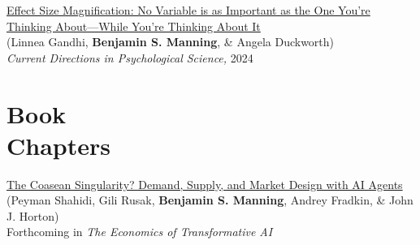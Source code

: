 \documentclass[margin,line,pifont,palatino,courier, 9pt]{res}
\begin{document}
\begin{resume}
\href{https://journals.sagepub.com/doi/full/10.1177/09637214241268222}{Effect Size Magnification: No Variable is as Important as the One You're Thinking About---While You're Thinking About It}\\
(Linnea Gandhi\footnotemark[\value{footnote}], \textbf{Benjamin S. Manning}, \& Angela Duckworth)\\
\textit{Current Directions in Psychological Science,} 2024

\section{\sc Book \\ Chapters}
\href{https://www.nber.org/books-and-chapters/economics-transformative-ai/coasean-singularity-demand-supply-and-market-design-ai-agents}{The Coasean Singularity? Demand, Supply, and Market Design with AI Agents}\\
(Peyman Shahidi\footnotemark[\value{footnote}], Gili Rusak\footnotemark[\value{footnote}], \textbf{Benjamin S. Manning}\footnotemark[\value{footnote}], Andrey Fradkin\footnotemark[\value{footnote}], \& John J. Horton\footnotemark[\value{footnote}])\\
Forthcoming in \textit{The Economics of Transformative AI}




\end{resume}
\end{document}
